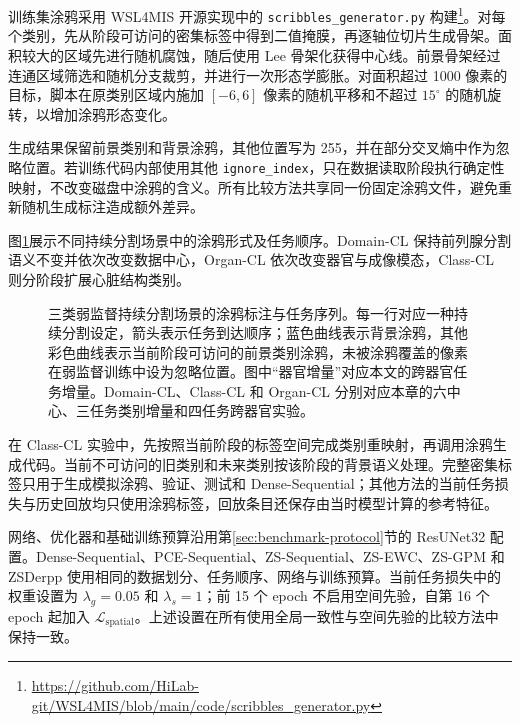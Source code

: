 \label{subsubsec:scribblecl-scribble-construction}
训练集涂鸦采用 WSL4MIS 开源实现中的 \texttt{scribbles\_generator.py} 构建\cite{luo2022scribble}\footnote{\url{https://github.com/HiLab-git/WSL4MIS/blob/main/code/scribbles_generator.py}}。对每个类别，先从阶段可访问的密集标签中得到二值掩膜，再逐轴位切片生成骨架。面积较大的区域先进行随机腐蚀，随后使用 Lee 骨架化获得中心线。前景骨架经过连通区域筛选和随机分支裁剪，并进行一次形态学膨胀。对面积超过 1000 像素的目标，脚本在原类别区域内施加 $[-6,6]$ 像素的随机平移和不超过 $15^\circ$ 的随机旋转，以增加涂鸦形态变化。

生成结果保留前景类别和背景涂鸦，其他位置写为 255，并在部分交叉熵中作为忽略位置。若训练代码内部使用其他 \texttt{ignore\_index}，只在数据读取阶段执行确定性映射，不改变磁盘中涂鸦的含义。所有比较方法共享同一份固定涂鸦文件，避免重新随机生成标注造成额外差异。

图\ref{fig:scribblecl-annotation-sequences}展示不同持续分割场景中的涂鸦形式及任务顺序。Domain-CL 保持前列腺分割语义不变并依次改变数据中心，Organ-CL 依次改变器官与成像模态，Class-CL 则分阶段扩展心脏结构类别。

\begin{figure}[htbp]
\centering
{}
\caption{三类弱监督持续分割场景的涂鸦标注与任务序列。每一行对应一种持续分割设定，箭头表示任务到达顺序；蓝色曲线表示背景涂鸦，其他彩色曲线表示当前阶段可访问的前景类别涂鸦，未被涂鸦覆盖的像素在弱监督训练中设为忽略位置。图中“器官增量”对应本文的跨器官任务增量。Domain-CL、Class-CL 和 Organ-CL 分别对应本章的六中心、三任务类别增量和四任务跨器官实验。}
\label{fig:scribblecl-annotation-sequences}
\end{figure}

在 Class-CL 实验中，先按照当前阶段的标签空间完成类别重映射，再调用涂鸦生成代码。当前不可访问的旧类别和未来类别按该阶段的背景语义处理。完整密集标签只用于生成模拟涂鸦、验证、测试和 Dense-Sequential；其他方法的当前任务损失与历史回放均只使用涂鸦标签，回放条目还保存由当时模型计算的参考特征。

\label{subsubsec:scribblecl-training-evaluation}
网络、优化器和基础训练预算沿用第\ref{sec:benchmark-protocol}节的 ResUNet32 配置。Dense-Sequential、PCE-Sequential、ZS-Sequential、ZS-EWC、ZS-GPM 和 ZSDerpp 使用相同的数据划分、任务顺序、网络与训练预算。当前任务损失中的权重设置为 $\lambda_g=0.05$ 和 $\lambda_s=1$；前 15 个 epoch 不启用空间先验，自第 16 个 epoch 起加入 $\mathcal{L}_{\mathrm{spatial}}$。上述设置在所有使用全局一致性与空间先验的比较方法中保持一致\cite{zhang2026zscribbleseg}。

